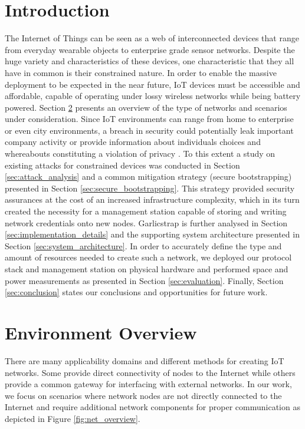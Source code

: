 \documentclass{sig-alternate-05-2015}
\begin{document}
\section{Introduction}
The Internet of Things can be seen as a web of interconnected devices that range from everyday wearable objects to enterprise grade sensor networks. 
Despite the huge variety and characteristics of these devices, one characteristic that they all have in common is their constrained nature. 
In order to enable the massive deployment to be expected in the near future, \gls{IoT} devices must be accessible and affordable, capable of operating under lossy wireless networks while being battery powered. 
Section \ref{sec:network_overview} presents an overview of the type of networks and scenarios under consideration. 
Since \gls{IoT} environments can range from home to enterprise or even city environments, a breach in security could potentially leak important company activity or provide information about individuals choices and whereabouts constituting a violation of privacy \cite{Ukil2015}. 
To this extent a study on existing attacks for constrained devices was conducted in Section \ref{sec:attack_analysis} and a common mitigation strategy (secure bootstrapping) presented in Section \ref{sec:secure_bootstrapping}. 
This strategy provided security assurances at the cost of an increased infrastructure complexity, which in its turn created the necessity for a management station capable of storing and writing network credentials onto new nodes.
Garlicstrap is further analysed in Section \ref{sec:implementation_details} and the supporting system architecture presented in Section \ref{sec:system_architecture}. In order to accurately define the type and amount of resources needed to create such a network, we deployed our protocol stack and management station on physical hardware and performed space and power measurements as presented in Section \ref{sec:evaluation}. 
Finally, Section \ref{sec:conclusion} states our conclusions and opportunities for future work.

\section{Environment Overview}
\label{sec:network_overview}
There are many applicability domains and different methods for creating \gls{IoT} networks. 
Some provide direct connectivity of nodes to the Internet while others provide a common gateway for interfacing with external networks. 
In our work, we focus on scenarios where network nodes are not directly connected to the Internet and require additional network components for proper communication as depicted in Figure \ref{fig:net_overview}.
\end{document}
